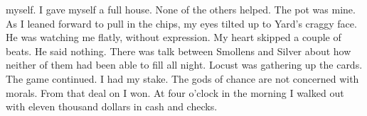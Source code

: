 \documentclass{novel}
\begin{document}
myself. I gave myself a full house. None of the others helped. The pot was mine. As I leaned forward to pull in the chips, my eyes tilted up to Yard’s craggy face. He was watching me flatly, without expression. My heart skipped a couple of beats. He said nothing. There was talk between Smollens and Silver about how neither of them had been able to fill all night. Locust was gathering up the cards. The game continued. I had my stake. The gods of chance are not concerned with morals. From that deal on I won. At four o’clock in the morning I walked out with eleven thousand dollars in cash and checks.


\begin{ChapterStart}

\vspace{3\nbs}
\end{ChapterStart}

\end{document}
